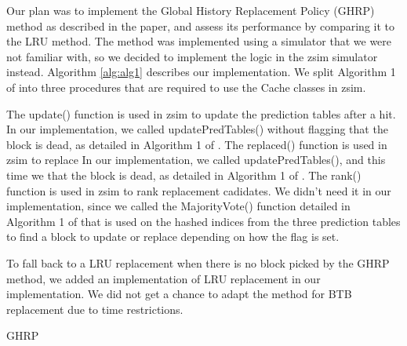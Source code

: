 \documentclass[11pt]{article}
\begin{document}
Our plan was to implement the Global History Replacement Policy (GHRP) method as described in the paper, and assess its performance by comparing it to the LRU method.
The method was implemented using a simulator that we were not familiar with, so we decided to implement the logic in the zsim simulator instead.
Algorithm \ref{alg:alg1} describes our implementation. We split Algorithm 1 of \cite{samira-ISCA18} into three procedures that are required to use the Cache classes in zsim.\par

The update() function is used in zsim to update the prediction tables after a hit. In our implementation, we called updatePredTables() without flagging that the block is dead, as detailed in Algorithm 1 of \cite{samira-ISCA18}. 
The replaced() function is used in zsim to replace In our implementation, we called updatePredTables(), and this time we that the block is dead, as detailed in Algorithm 1 of \cite{samira-ISCA18}.
The rank() function is used in zsim to rank replacement cadidates. We didn't need it in our implementation, since we called the MajorityVote() function detailed in Algorithm 1 of \cite{samira-ISCA18} that is used on the hashed indices from the three prediction tables to find a block to update or replace depending on how the flag is set.\par

To fall back to a LRU replacement when there is no block picked by the GHRP method, we added an implementation of LRU replacement in our implementation.
We did not get a chance to adapt the method for BTB replacement due to time restrictions.
\begin{algorithm}[h]
	\label{alg:alg1}
	\caption{GHRP}
	\begin{algorithmic}[1]
		\renewcommand{\algorithmicrequire}{\textbf{Input: address}}
		\EndProcedure
		\EndProcedure
	\end{algorithmic}
\end{algorithm}
\end{document}
